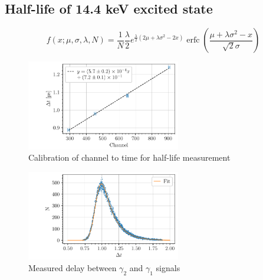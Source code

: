 \subsection{Half-life of 14.4 keV excited state}

\begin{equation}
    f(x;\mu,\sigma,\lambda, N) = \frac{1}{N} \frac{\lambda}{2} e^{\frac{\lambda}{2} (2 \mu + \lambda \sigma^2 - 2 x)}
             \operatorname{erfc} \left(\frac{\mu + \lambda \sigma^2 - x}{ \sqrt{2} \sigma}\right)
\end{equation}

\begin{figure}[h]
    \centering
    \includegraphics[width=0.6\textwidth]{figures/calibration_time_interval.pdf}    
    \caption{Calibration of channel to time for half-life measurement}
    \label{fig:calibration_halflife}
\end{figure}

\begin{figure}[h]
    \centering
    \includegraphics[width=0.6\textwidth]{figures/co57_halflife.pdf}    
    \caption{Measured delay between \(\gamma_2\) and \(\gamma_1\) signals}
    \label{fig:delay_gamma12}
\end{figure}

